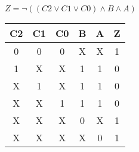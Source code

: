 
\begin{center}
    {\(Z = \lnot ((C2 \lor C1 \lor C0) \land B \land A) \)}
    \begin{table}[h] %
        \begin{center}
            \begin{tabular}{|c|c|c|c|c||c|} \hline
            C2 & C1 & C0 & B & A & Z \\ \hline\hline
            0  & 0  & 0  & X & X & 1 \\ \hline
            1  & X  & X  & 1 & 1 & 0 \\ \hline
            X  & 1  & X  & 1 & 1 & 0 \\ \hline
            X  & X  & 1  & 1 & 1 & 0 \\ \hline
            X  & X  & X  & 0 & X & 1 \\ \hline
            X  & X  & X  & X & 0 & 1 \\ \hline
            \end{tabular}
        \end{center}
    \end{table}
\end{center}
